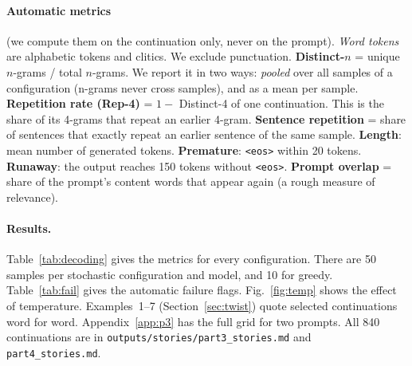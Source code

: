 \documentclass[11pt,a4paper]{article}
\begin{document}
\paragraph{Automatic metrics} (we compute them on the continuation only, never on the prompt).
\emph{Word tokens} are alphabetic tokens and clitics. We exclude punctuation.
\textbf{Distinct-$n$} = unique $n$-grams / total $n$-grams. We report it in two ways:
\emph{pooled} over all samples of a configuration (n-grams never cross samples), and as a mean
per sample.
\textbf{Repetition rate (Rep-4)} = $1 -$ Distinct-4 of one continuation. This is the share of its
4-grams that repeat an earlier 4-gram. \textbf{Sentence repetition} = share of sentences that
exactly repeat an earlier sentence of the same sample. \textbf{Length}: mean number of generated
tokens. \textbf{Premature}: \texttt{<eos>} within 20 tokens. \textbf{Runaway}: the output reaches
150 tokens without \texttt{<eos>}. \textbf{Prompt overlap} = share of the prompt's content words
that appear again (a rough measure of relevance).

\paragraph{Results.} Table~\ref{tab:decoding} gives the metrics for every configuration. There are
50 samples per stochastic configuration and model, and 10 for greedy. Table~\ref{tab:fail} gives
the automatic failure flags. Fig.~\ref{fig:temp} shows the effect of temperature.
Examples~1--7 (Section~\ref{sec:twist}) quote selected continuations word for word.
Appendix~\ref{app:p3} has the full grid for two prompts. All 840 continuations are in
\texttt{outputs/stories/part3\_stories.md} and \texttt{part4\_stories.md}.
\end{document}
